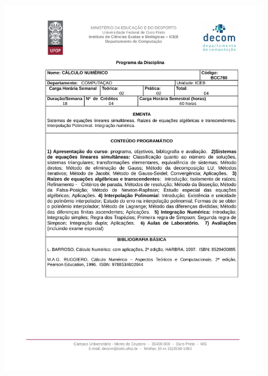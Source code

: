 \begin{figure}[p]
	\centering 
	\includegraphics[scale=0.7]{capitulos/anexo1-programas-disciplina/p31.pdf}
\end{figure}

